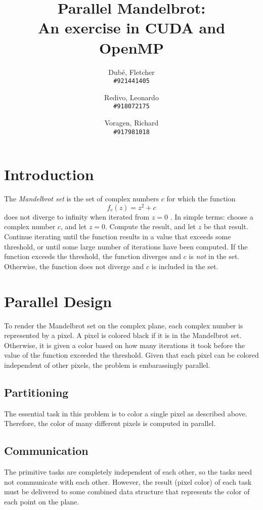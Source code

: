 \documentclass{article}
\author{
	Dub\'e, Fletcher\\
	\texttt{\#921441405}
	\and
	Redivo, Leonardo\\
	\texttt{\#918072175}
	\and
	Voragen, Richard\\
	\texttt{\#917981018}
}
\title{Parallel Mandelbrot: \\An exercise in CUDA and OpenMP}
\begin{document}
\maketitle

\section{Introduction} \label{sec:intro}
The \emph{Mandelbrot set} is the set of complex numbers $c$ for which the function
\begin{equation} \label{eq:mandelbrot}
f_c(z) = z^2 + c
\end{equation}
does not diverge to infinity when iterated from $z = 0$ \cite{mandel_wiki}. In simple terms: choose a complex number $c$, and let $z = 0$. Compute the result, and let $z$ be that result. Continue iterating until the function results in a value that exceeds some threshold, or until some large number of iterations have been computed. If the function exceeds the threshold, the function diverges and $c$ is \emph{not} in the set. Otherwise, the function does not diverge and $c$ is included in the set.

\section{Parallel Design}
To render the Mandelbrot set on the complex plane, each complex number is represented by a pixel. A pixel is colored black if it is in the Mandelbrot set. Otherwise, it is given a color based on how many iterations it took before the value of the function exceeded the threshold. Given that each pixel can be colored independent of other pixels, the problem is embarassingly parallel.

\subsection{Partitioning}
The essential task in this problem is to color a single pixel as described above. Therefore, the color of many different pixels is computed in parallel.

\subsection{Communication}
The primitive tasks are completely independent of each other, so the tasks need not communicate with each other. However, the result (pixel color) of each task must be delivered to some combined data structure that represents the color of each point on the plane.
\end{document}
